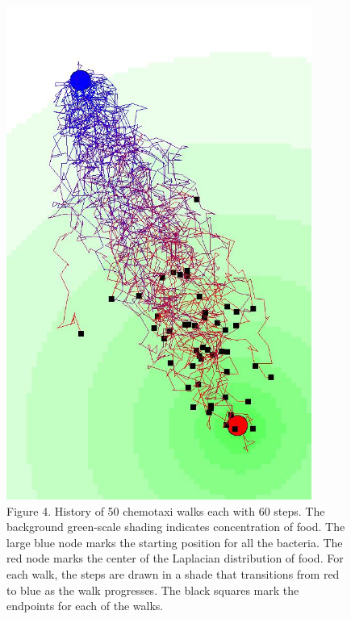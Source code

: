 \documentclass{article}
\begin{document}
\begin{figure}[h]
\centering
\includegraphics[width=10cm,keepaspectratio]{images/chemotaxi-paths-small.jpg}
\captionsetup{labelformat=empty} \caption{Figure 4. History of 50 chemotaxi walks each with 60 steps. The background green-scale shading indicates concentration of food. The large blue node marks the starting position for all the bacteria. The red node marks the center of the Laplacian distribution of food. For each walk, the steps are drawn in a shade that transitions from red to blue as the walk progresses. The black squares mark the endpoints for each of the walks.}
\end{figure}
\end{document}
